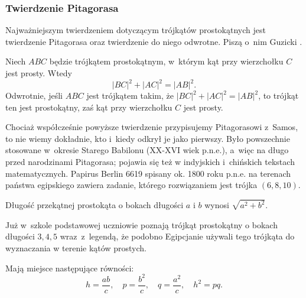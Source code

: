 %

\subsubsection{Twierdzenie Pitagorasa}
Najważniejszym twierdzeniem dotyczącym trójkątów prostokątnych jest twierdzenie Pitagorasa oraz twierdzenie do niego odwrotne.
Piszą o~nim Guzicki \cite[s. 160]{guzicki_2021}.


\begin{theorem}[Pitagorasa, ok. 500 r. p.n.e.]
%
\label{theorem_pythagorean}%
    Niech $ABC$ będzie trójkątem prostokątnym, w~którym kąt przy wierzchołku $C$ jest prosty.
    Wtedy
    \begin{equation}
        |BC|^2 + |AC|^2 = |AB|^2.
    \end{equation}
    Odwrotnie, jeśli $ABC$ jest trójkątem takim, że $|BC|^2 + |AC|^2 = |AB|^2$, to trójkąt ten jest prostokątny, zaś kąt przy wierzchołku $C$ jest prosty.
\end{theorem}

Chociaż współcześnie powyższe twierdzenie przypisujemy Pitagorasowi z~Samos, to nie wiemy dokładnie, kto i~kiedy odkrył je jako pierwszy.
%
Było powszechnie stosowane w~okresie Starego Babilonu (XX-XVI wiek p.n.e.), a~więc na długo przed narodzinami Pitagorasa; pojawia się też w indyjskich i~chińskich tekstach matematycznych.
Papirus Berlin 6619 spisany ok. 1800 roku p.n.e. na terenach państwa egipskiego zawiera zadanie, którego rozwiązaniem jest trójka $(6, 8, 10)$.

\begin{corollary}
    Długość przekątnej prostokąta o bokach długości $a$ i $b$ wynosi $\sqrt{a^2 + b^2}$.
\end{corollary}

Już w~szkole podstawowej uczniowie poznają trójkąt prostokątny o bokach długości $3, 4, 5$ wraz~z~legendą, że podobno Egipcjanie używali tego trójkąta do wyznaczania w terenie kątów prostych.

\begin{proposition}
    Mają miejsce następujące równości:
    \begin{equation}
        h = \frac{ab}{c}, \quad
        p = \frac{b^2}{c}, \quad
        q = \frac{a^2}{c}, \quad
        h^2 = pq.
    \end{equation}
\end{proposition}

